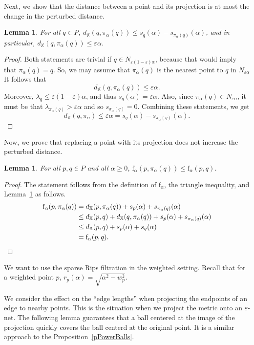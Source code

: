 \documentclass[a4paper]{article}
\newcommand\X{\mathbb{X}}
\newcommand\dX[2]{d_\X(#1,#2)}
\newtheorem{lemma}[theorem]{Lemma}
\newcommand{\e}{\varepsilon}
\newcommand{\ir}{\lambda}
\newcommand{\net}{N}
\newcommand{\ff}{\mathrm{f}}
\newcommand{\proj}{\pi}
\begin{document}
Next, we show that the distance between a point and its projection is at most the change in the perturbed distance.
  \begin{lemma}\label{lem:distance_to_proj} 
    For all $q\in P$, $\dX{q}{\proj_\alpha(q)} \le s_q(\alpha) - s_{\proj_\alpha(q)}(\alpha)$, and in particular, $\dX{q}{\proj_\alpha(q)}\le \e \alpha$.
  \end{lemma}
  \begin{proof}
    Both statements are trivial if $q\in \net_{\e(1-\e)\alpha}$, because that would imply that $\proj_\alpha(q) = q$.
    So, we may assume that $\proj_\alpha(q)$ is the nearest point to $q$ in $\net_{\e \alpha}$
    It follows that 
\[
      \dX{q}{\proj_\alpha(q)} \le \e \alpha.
    \]
Moreover, $\ir_q \le \e(1-\e)\alpha$, and thus $s_q(\alpha) = \e \alpha$.    
    Also, since $\proj_\alpha(q)\in \net_{\e \alpha}$, it must be that $\ir_{\proj_\alpha(q)} > \e \alpha$ and so $s_{\proj_\alpha(q)} = 0$.
    Combining these statements, we get
    \[
      \dX{q}{\proj_\alpha} \le \e \alpha = s_q(\alpha) - s_{\proj_\alpha(q)}(\alpha).
    \]
  \end{proof}

Now, we prove that replacing a point with its projection does not increase the perturbed distance.
  \begin{lemma}\label{lem:distances_dont_grow}
    For all $p,q\in P$ and all $\alpha\ge 0$, $\ff_\alpha(p,\proj_\alpha(q)) \le \ff_\alpha(p,q)$.\qedhere
  \end{lemma}
  \begin{proof}
    The statement follows from the definition of $\ff_\alpha$, the triangle inequality, and Lemma~\ref{lem:distance_to_proj} as follows.
    \begin{align*}
      \ff_\alpha(p, \proj_\alpha(q)) 
        &= \dX{p}{\proj_\alpha(q)} + s_p(\alpha) + s_{\proj_\alpha(q)}(\alpha)\\ &\le \dX{p}{q} + \dX{q}{\proj_\alpha(q)} + s_p(\alpha) + s_{\proj_\alpha(q)}(\alpha)\\ &\le \dX{p}{q} + s_p(\alpha) + s_q(\alpha)\\ &= \ff_\alpha(p,q).\qedhere
    \end{align*}
  \end{proof}

We want to use the sparse Rips filtration in the weighted setting. 
Recall that for a weighted point $p$, $r_p(\alpha)=\sqrt{\alpha^2-w_p^2}$.

We consider the effect on the ``edge lengths'' when projecting the endpoints of an edge to nearby points.
This is the situation when we project the metric onto an $\e$-net. 
The following lemma guarantees that a ball centered at the image of the projection quickly covers the ball centerd at the original point.
It is a similar approach to the Proposition~\ref{pPowerBalls}.
  
\end{document}
